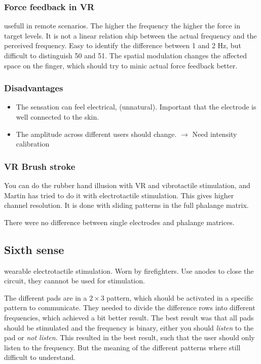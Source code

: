 \documentclass[a4paper]{article}
\begin{document}
\subsubsection{Force feedback in VR}
usefull in remote scenarios. The higher the frequency the higher the force in target levels. It is not a linear relation ship between the actual frequency and the perceived frequency. Easy to identify the difference between 1 and 2 Hz, but difficult to distinguish 50 and 51. 
The spatial modulation changes the affected space on the finger, which should try to minic actual force feedback better.

\subsubsection{Disadvantages}
\begin{itemize}
	\item The sensation can feel electrical, (unnatural). Important that the electrode is well connected to the skin. 
	\item The amplitude across different users should change. $ \rightarrow $ Need intensity calibration
\end{itemize}

\subsubsection{VR Brush stroke}

You can do the rubber hand illusion with VR and vibrotactile stimulation, and Martin has tried to do it with electrotactile stimulation. This gives higher channel resolution.  It is done with sliding patterns in the full phalange matrix.

There were no difference between single electrodes and phalange matrices. 

\subsection{Sixth sense}
wearable electrotactile stimulation. Worn by firefighters. Use anodes to close the circuit, they cannnot be used for stimulation. 

The different pads are in a $ 2 \times 3 $ pattern, which should be activated in a specific pattern to communicate. They needed to divide the difference rows into different frequencies, which achieved a bit better result. The best result was that all pads should be stimulated and the frequency is binary, either you should \textit{listen} to the pad or \textit{not listen}. This resulted in the best result, such that the user should only listen to the frequency. But the meaning of the different patterns where still difficult to understand. 
\end{document}
